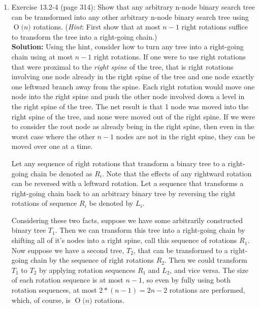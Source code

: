 \documentclass[11pts]{article}
\newcommand{\BigO}[1]{\ensuremath{\operatorname{O}\bigl(#1\bigr)}}
\begin{document}
\begin{enumerate}
\newpage
\item Exercise 13.2-4 (page 314): Show that any arbitrary n-node
  binary search tree can be transformed into any other
  arbitrary n-node binary search tree using \BigO{n} rotations.
  (\textit{Hint}: First show that at most $n - 1$ right rotations
  suffice to transform the tree into a right-going chain.)\\

  \textbf{Solution:} Using the hint, consider how to turn any tree into a 
  right-going chain using at most $n - 1$ right rotations. If one were to use
  right rotations that were proximal to the \emph{right spine} of the tree,
  that is right rotations involving one node already in the right spine of
  the tree and one node exactly one leftward branch away from the spine.
  Each right rotation would move one node into the right spine and push the
  other node involved down a level in the right spine of the tree.
  The net result is that 1 node was moved into the right spine of the tree, and
  none were moved out of the right spine. If we were to consider the root
  node as already being in the right spine, then even in the worst case where
  the other $n - 1$ nodes are not in the right spine, they can be moved over
  one at a time.

  Let any sequence of right rotations that transform a binary tree to
  a right-going chain be denoted as $R_i$. Note that the effects of
  any rightward rotation can be reversed with a leftward rotation.
  Let a sequence that transforms a right-going chain back to an
  arbitrary binary tree by reversing the right rotations of sequence
  $R_i$ be denoted by $L_i$.

  Considering these two facts, suppose we have some arbitrarily constructed
  binary tree $T_1$. Then we can transform this tree into a right-going chain by
  shifting all of it's nodes into a right spine, call this sequence of
  rotations $R_1$. Now suppose we have a second tree, $T_2$, that can be
  transformed to a right-going chain by the sequence of right rotations $R_2$.
  Then we could transform $T_1$ to $T_2$ by applying rotation sequences
  $R_1$ and $L_2$, and vice versa. The size of each rotation sequence is at
  most $n - 1$, so even by fully using both rotation sequences, at most
  $2 * (n - 1) = 2n - 2$ rotations are performed, which, of course, is
  \BigO{n} rotations.

\end{enumerate}
\end{document}
